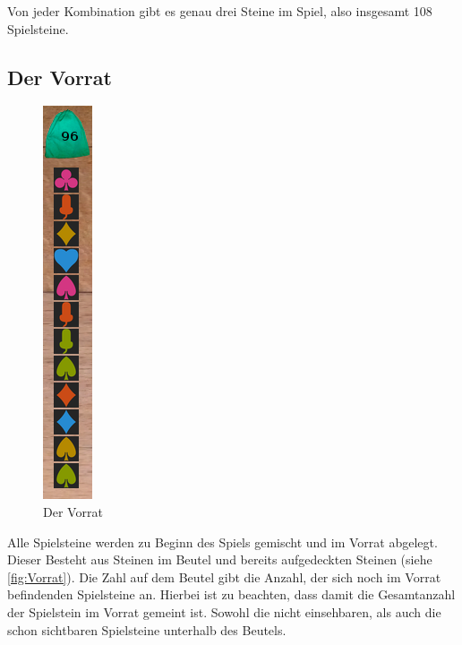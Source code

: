 \documentclass[a4paper, ngerman]{scrartcl}
\begin{document}
Von jeder Kombination gibt es genau drei Steine im Spiel, also insgesamt 108 Spielsteine.
\subsection{Der Vorrat}
\begin{figure}
	\includegraphics[scale = 0.7]{images/Vorratsbeutel}
	\caption{Der Vorrat}
	\label{fig:Vorrat}
\end{figure}
 Alle Spielsteine werden zu Beginn des Spiels gemischt und im Vorrat abgelegt. Dieser Besteht aus Steinen im Beutel und bereits aufgedeckten Steinen (siehe \autoref{fig:Vorrat}). Die Zahl auf dem Beutel gibt die Anzahl, der sich noch im Vorrat befindenden Spielsteine an. Hierbei ist zu beachten, dass damit die Gesamtanzahl der Spielstein im Vorrat gemeint ist. Sowohl die nicht einsehbaren, als auch die schon sichtbaren Spielsteine unterhalb des Beutels.\\
\end{document}

